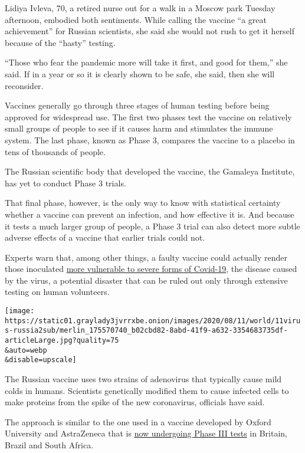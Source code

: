 Lidiya Ivleva, 70, a retired nurse out for a walk in a Moscow park
Tuesday afternoon, embodied both sentiments. While calling the vaccine
``a great achievement'' for Russian scientists, she said she would not
rush to get it herself because of the ``hasty'' testing.

``Those who fear the pandemic more will take it first, and good for
them,'' she said. If in a year or so it is clearly shown to be safe, she
said, then she will reconsider.

Vaccines generally go through three stages of human testing before being
approved for widespread use. The first two phases test the vaccine on
relatively small groups of people to see if it causes harm and
stimulates the immune system. The last phase, known as Phase 3, compares
the vaccine to a placebo in tens of thousands of people.

The Russian scientific body that developed the vaccine, the Gamaleya
Institute, has yet to conduct Phase 3 trials.

That final phase, however, is the only way to know with statistical
certainty whether a vaccine can prevent an infection, and how effective
it is. And because it tests a much larger group of people, a Phase 3
trial can also detect more subtle adverse effects of a vaccine that
earlier trials could not.

Experts warn that, among other things, a faulty vaccine could actually
render those inoculated
\href{https://www.the-scientist.com/news-opinion/covid-19-vaccine-researchers-mindful-of-immune-enhancement-67576}{more
vulnerable to severe forms of Covid-19}, the disease caused by the
virus, a potential disaster that can be ruled out only through extensive
testing on human volunteers.

\texttt{[image: https://static01.graylady3jvrrxbe.onion/images/2020/08/11/world/11virus-russia2sub/merlin\_175570740\_b02cbd82-8abd-41f9-a632-3354683735df-articleLarge.jpg?quality=75\\\&auto=webp\\\&disable=upscale]}

The Russian vaccine uses two strains of adenovirus that typically cause
mild colds in humans. Scientists genetically modified them to cause
infected cells to make proteins from the spike of the new coronavirus,
officials have said.

The approach is similar to the one used in a vaccine developed by Oxford
University and AstraZeneca that is
\href{https://www.healthline.com/health-news/heres-what-we-know-about-the-demographic-makeup-of-the-covid-19-vaccine-trials}{now
undergoing Phase III tests} in Britain, Brazil and South Africa.

